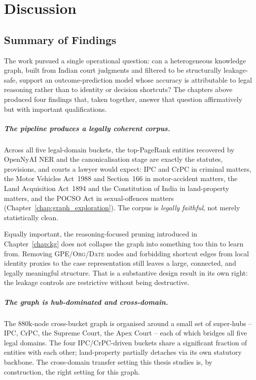 \chapter{Discussion}
\label{chap:discussion}

\section{Summary of Findings}

The work pursued a single operational question: can a heterogeneous
knowledge graph, built from Indian court judgments and filtered to be
structurally leakage-safe, support an outcome-prediction model whose
accuracy is attributable to legal reasoning rather than to identity or
decision shortcuts? The chapters above produced four findings that,
taken together, answer that question affirmatively but with
important qualifications.

\paragraph{The pipeline produces a legally coherent corpus.} Across all
five legal-domain buckets, the top-PageRank entities recovered by
OpenNyAI NER and the canonicalisation stage are exactly the statutes,
provisions, and courts a lawyer would expect: IPC and CrPC in criminal
matters, the Motor Vehicles Act~1988 and Section~166 in motor-accident
matters, the Land Acquisition Act~1894 and the Constitution of India
in land-property matters, and the POCSO Act in sexual-offences matters
(Chapter~\ref{chap:graph_exploration}). The corpus is
\emph{legally faithful}, not merely statistically clean.

{\color{blue}Equally important, the reasoning-focused pruning introduced
in Chapter~\ref{chap:kg} does not collapse the graph into something too
thin to learn from. Removing \textsc{GPE}/\textsc{Org}/\textsc{Date}
nodes and forbidding shortcut edges from local identity proxies to the
case representation still leaves a large, connected, and legally
meaningful structure. That is a substantive design result in its own
right: the leakage controls are restrictive without being destructive.\par}

\paragraph{The graph is hub-dominated and cross-domain.} The $880$k-node
cross-bucket graph is organised around a small set of super-hubs --
IPC, CrPC, the Supreme Court, the Apex Court -- each of which bridges
all five legal domains. The four IPC/CrPC-driven buckets share a
significant fraction of entities with each other; land-property
partially detaches via its own statutory backbone. The cross-domain
transfer setting this thesis studies is, by construction, the right
setting for this graph.

